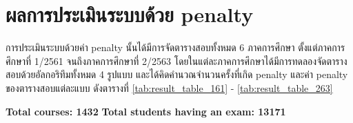 \newpage
\section{ผลการประเมินระบบด้วย penalty}
การประเมินระบบด้วยค่า penalty นั้นได้มีการจัดตารางสอบทั้งหมด 6 ภาคการศึกษา ตั้งแต่ภาคการศึกษาที่ 1/2561 จนถึงภาคการศึกษาที่ 2/2563
โดยในแต่ละภาคการศึกษาได้มีการทดลองจัดตารางสอบด้วยอัลกอริทึมทั้งหมด 4 รูปแบบ และได้คิดคำนวณจำนวนครั้งที่เกิด penalty และค่า penalty ของตารางสอบแต่ละแบบ ดังตารางที่ \ref{tab:result_table_161} - \ref{tab:result_table_263}
\begin{table}[]
    \centering
    \textbf{Total courses: 1432} \quad \quad \textbf{Total students having an exam: 13171}
\end{table}
